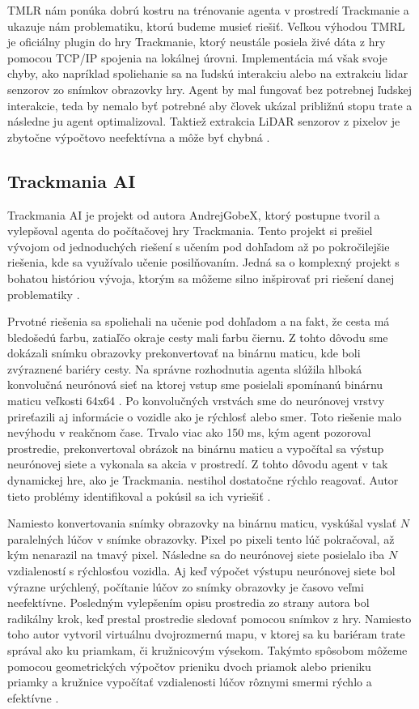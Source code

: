 TMLR nám ponúka dobrú kostru na trénovanie agenta v prostredí Trackmanie a ukazuje nám problematiku, ktorú budeme musieť riešiť. Veľkou výhodou TMRL je oficiálny plugin do hry Trackmanie, ktorý neustále posiela živé dáta z hry pomocou TCP/IP spojenia na lokálnej úrovni. Implementácia má však svoje chyby, ako napríklad spoliehanie sa na ľudskú interakciu alebo na extrakciu lidar senzorov zo snímkov obrazovky hry. Agent by mal fungovať bez potrebnej ľudskej interakcie, teda by nemalo
byť potrebné aby človek ukázal približnú stopu trate a následne ju agent optimalizoval.
Taktiež extrakcia LiDAR senzorov z pixelov je zbytočne výpočtovo neefektívna a môže byť chybná \cite{tmrl_github}.


\subsection{Trackmania AI}

Trackmania AI je projekt od autora AndrejGobeX, ktorý postupne tvoril a vylepšoval agenta do počítačovej hry Trackmania. Tento projekt si prešiel vývojom od jednoduchých riešení s učením pod dohľadom až po pokročilejšie riešenia, kde sa využívalo učenie posilňovaním. Jedná sa o komplexný projekt s bohatou históriou vývoja, ktorým sa môžeme silno inšpirovať pri riešení danej problematiky \cite{trackmania_ai_github}.

Prvotné riešenia sa spoliehali na učenie pod dohľadom a na fakt, že cesta má bledošedú farbu, zatiaľčo okraje cesty mali farbu čiernu. Z tohto dôvodu sme dokázali snímku obrazovky prekonvertovať na binárnu maticu, kde boli zvýraznené bariéry cesty. Na správne rozhodnutia agenta slúžila hlboká konvolučná neurónová sieť na ktorej vstup sme posielali spomínanú binárnu maticu veľkosti 64x64 . Po konvolučných vrstvách sme do neurónovej vrstvy prireťazili aj informácie o vozidle ako je rýchlosť alebo smer. Toto riešenie malo nevýhodu v reakčnom čase. Trvalo viac ako 150 ms, kým agent pozoroval prostredie, prekonvertoval obrázok na binárnu maticu a vypočítal sa výstup neurónovej siete a vykonala sa akcia v prostredí. Z tohto dôvodu agent v tak dynamickej hre, ako je Trackmania. nestihol dostatočne rýchlo reagovať. Autor tieto problémy identifikoval a pokúsil sa ich vyriešiť \cite{trackmania_ai_github}.

Namiesto konvertovania snímky obrazovky na binárnu maticu, vyskúšal vyslať \(N\) paralelných lúčov v snímke obrazovky. Pixel po pixeli tento lúč pokračoval, až kým nenarazil na tmavý pixel. Následne sa do neurónovej siete posielalo iba \(N\) vzdialeností s rýchlosťou vozidla. Aj keď výpočet výstupu neurónovej siete bol výrazne urýchlený, počítanie lúčov zo snímky obrazovky je časovo veľmi neefektívne. Posledným vylepšením opisu prostredia zo strany autora bol radikálny krok, keď prestal prostredie sledovať pomocou snímkov z hry. Namiesto toho autor vytvoril virtuálnu dvojrozmernú mapu, v ktorej sa ku bariéram trate správal ako ku priamkam, či kružnicovým výsekom. Takýmto spôsobom môžeme pomocou geometrických výpočtov prieniku dvoch priamok alebo prieniku priamky a kružnice vypočítať vzdialenosti lúčov rôznymi smermi rýchlo a efektívne \cite{trackmania_ai_github}.


